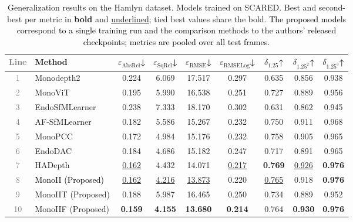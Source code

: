 \documentclass[a4paper,fleqn]{cas-dc}
\begin{document}
{\begin{table}[!hbt]
\centering
\begin{tabular}{clccccccc}
\toprule
\textcolor{gray}{Line} & Method & $\varepsilon_\text{AbsRel}$↓ & 
        $\varepsilon_\text{SqRel}$↓ & 
        $\varepsilon_\text{RMSE}$↓ & 
        $\varepsilon_\text{RMSELog}$↓ & 
        $\delta_{1.25}$↑ & $\delta_{1.25^2}$↑ & 
        $\delta_{1.25^3}$↑ \\
\midrule
\textcolor{gray}{1} &Monodepth2     & 0.224 & 6.069 & 17.517 & 0.297 & 0.635 & 0.856 & 0.938 \\
\textcolor{gray}{2} &MonoViT        & 0.195 & 5.990 & 16.538 & 0.251 & 0.727 & 0.889 & 0.956 \\
\textcolor{gray}{3} &EndoSfMLearner & 0.238 & 7.333 & 18.170 & 0.302 & 0.631 & 0.862 & 0.945 \\
\textcolor{gray}{4} &AF-SfMLearner  & 0.182 & 5.586 & 15.267 & 0.232 & 0.750 & 0.911 & 0.968 \\
\textcolor{gray}{5} &MonoPCC        & 0.172 & 4.984 & 15.176 & 0.232 & 0.758 & 0.905 & 0.965 \\
\textcolor{gray}{6} &EndoDAC        & 0.184 & 4.686 & 15.182 & 0.247 & 0.717 & 0.891 & 0.965 \\
\textcolor{gray}{7} &HADepth        & \underline{0.162} & 4.432 & 14.071 & \underline{0.217} & \textbf{0.769} & \underline{0.926} & \textbf{0.976} \\
\midrule
\textcolor{gray}{8} & \textcolor{black}{MonoII (Proposed)} & \underline{0.162} & \underline{4.216} & \underline{13.873} & 0.220 & \underline{0.765} & 0.918 & \textbf{0.976} \\
\textcolor{gray}{9} &MonoIIT (Proposed) & 0.188 & 5.987 & 16.465 & 0.250 & 0.734 & 0.889 & 0.952 \\
\textcolor{gray}{10} &MonoIIF (Proposed) & \textbf{0.159} & \textbf{4.155} & \textbf{13.680} & \textbf{0.214} & 0.764 & \textbf{0.930} & \textbf{0.976} \\
\bottomrule
\end{tabular}
\caption{Generalization results on the Hamlyn dataset. 
Models trained on SCARED. Best and second-best 
per metric in \textbf{bold} and \underline{underlined}; tied best values share the bold. \textcolor{black}{The proposed models correspond to a single training run and the comparison methods to the authors' released checkpoints; metrics are pooled over all test frames.}}
\label{tab:quant_hamlyn}
\end{table}

}
\end{document}
